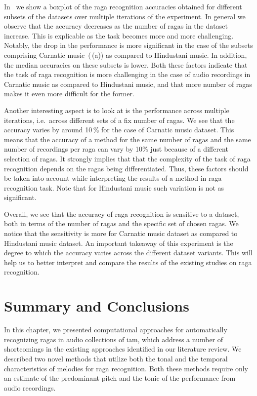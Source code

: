 In~ we show a boxplot of the \gls{raga} recognition accuracies obtained for different subsets of the datasets over multiple iterations of the experiment. In general we observe that the accuracy decreases as the number of \glspl{raga} in the dataset increase.  This is explicable as the task becomes more and more challenging.  Notably, the drop in the performance is more significant in the case of the subsets comprising Carnatic music~(\,(a)) as compared to Hindustani music. In addition, the median accuracies on these subsets is lower. Both these factors indicate that the task of \gls{raga} recognition is more challenging in the case of audio recordings in Carnatic music as compared to Hindustani music, and that more number of \glspl{raga} makes it even more difficult for the former. 

Another interesting aspect is to look at is the performance across multiple iterations, i.e.~across different sets of a fix number of \glspl{raga}. We see that the accuracy varies by around 10\,\% for the case of Carnatic music dataset. This means that the accuracy of a method for the same number of \glspl{raga} and the same number of recordings per \gls{raga} can vary by 10\% just because of a different selection of \glspl{raga}. It strongly implies that that the complexity of the task of \gls{raga} recognition depends on the \glspl{raga} being differentiated. Thus, these factors should be taken into account while interpreting the results of a method in \gls{raga} recognition task. Note that for Hindustani music such variation is not as significant. 

Overall, we see that the accuracy of \gls{raga} recognition is sensitive to a dataset, both in terms of the number of \glspl{raga} and the specific set of chosen \glspl{raga}. We notice that the sensitivity is more for Carnatic music dataset as compared to Hindustani music dataset. An important takeaway of this experiment is the degree to which the accuracy varies across the different dataset variants. This will help us to better interpret and compare the results of the existing studies on \gls{raga} recognition. 


\section{Summary and Conclusions}
\label{sec:conclusions_raga_recognition}

In this chapter, we presented computational approaches for automatically recognizing \glspl{raga} in audio collections of \gls{iam}, which address a number of shortcomings in the existing approaches identified in our literature review. We described two novel methods that utilize both the tonal and the temporal characteristics of melodies for \gls{raga} recognition. Both these methods require only an estimate of the predominant pitch and the tonic of the performance from audio recordings.

